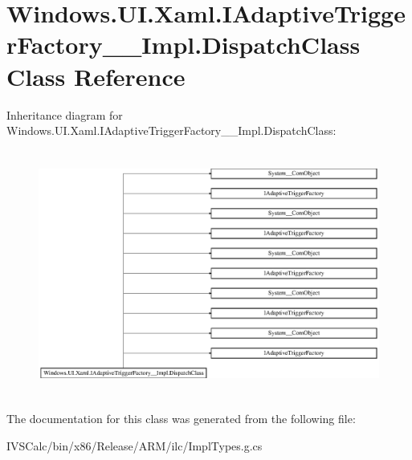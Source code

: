 \hypertarget{class_windows_1_1_u_i_1_1_xaml_1_1_i_adaptive_trigger_factory_____impl_1_1_dispatch_class}{}\section{Windows.\+U\+I.\+Xaml.\+I\+Adaptive\+Trigger\+Factory\+\_\+\+\_\+\+Impl.\+Dispatch\+Class Class Reference}
\label{class_windows_1_1_u_i_1_1_xaml_1_1_i_adaptive_trigger_factory_____impl_1_1_dispatch_class}
Inheritance diagram for Windows.\+U\+I.\+Xaml.\+I\+Adaptive\+Trigger\+Factory\+\_\+\+\_\+\+Impl.\+Dispatch\+Class\+:\begin{figure}[H]
\begin{center}
\leavevmode
\includegraphics[height=8.126648cm]{class_windows_1_1_u_i_1_1_xaml_1_1_i_adaptive_trigger_factory_____impl_1_1_dispatch_class}
\end{center}
\end{figure}


The documentation for this class was generated from the following file\+:\begin{DoxyCompactItemize}
\item 
I\+V\+S\+Calc/bin/x86/\+Release/\+A\+R\+M/ilc/Impl\+Types.\+g.\+cs\end{DoxyCompactItemize}
